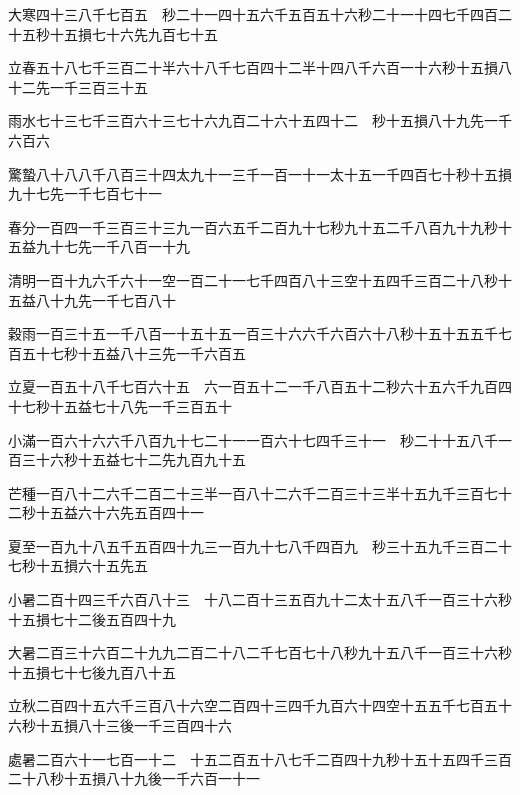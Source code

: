 \begin{pinyinscope}
 大寒四十三八千七百五　秒二十一四十五六千五百五十六秒二十一十四七千四百二十五秒十五損七十六先九百七十五



 立春五十八七千三百二十半六十八千七百四十二半十四八千六百一十六秒十五損八十二先一千三百三十五



 雨水七十三七千三百六十三七十六九百二十六十五四十二　秒十五損八十九先一千六百六



 驚蟄八十八八千八百三十四太九十一三千一百一十一太十五一千四百七十秒十五損九十七先一千七百七十一



 春分一百四一千三百三十三九一百六五千二百九十七秒九十五二千八百九十九秒十五益九十七先一千八百一十九



 清明一百十九六千六十一空一百二十一七千四百八十三空十五四千三百二十八秒十五益八十九先一千七百八十



 穀雨一百三十五一千八百一十五十五一百三十六六千六百六十八秒十五十五五千七百五十七秒十五益八十三先一千六百五



 立夏一百五十八千七百六十五　六一百五十二一千八百五十二秒六十五六千九百四十七秒十五益七十八先一千三百五十



 小滿一百六十六六千八百九十七二十一一百六十七四千三十一　秒二十十五八千一百三十六秒十五益七十二先九百九十五



 芒種一百八十二六千二百二十三半一百八十二六千二百三十三半十五九千三百七十二秒十五益六十六先五百四十一



 夏至一百九十八五千五百四十九三一百九十七八千四百九　秒三十五九千三百二十七秒十五損六十五先五



 小暑二百十四三千六百八十三　十八二百十三五百九十二太十五八千一百三十六秒十五損七十二後五百四十九



 大暑二百三十六百二十九九二百二十八二千七百七十八秒九十五八千一百三十六秒十五損七十七後九百八十五



 立秋二百四十五六千三百八十六空二百四十三四千九百六十四空十五五千七百五十六秒十五損八十三後一千三百四十六



 處暑二百六十一七百一十二　十五二百五十八七千二百四十九秒十五十五四千三百二十八秒十五損八十九後一千六百一十一




\end{pinyinscope}
